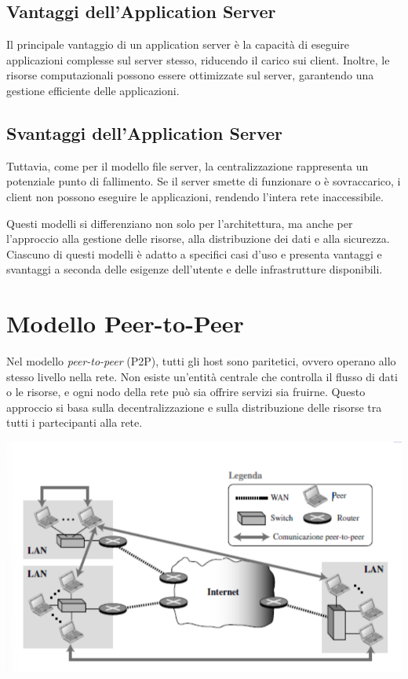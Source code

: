 \documentclass[12pt]{report}
\begin{document}
	\subsection{Vantaggi dell'Application Server}
	Il principale vantaggio di un application server è la capacità di eseguire applicazioni complesse sul server stesso, riducendo il carico sui client. Inoltre, le risorse computazionali possono essere ottimizzate sul server, garantendo una gestione efficiente delle applicazioni.

	\subsection{Svantaggi dell'Application Server}
	Tuttavia, come per il modello file server, la centralizzazione rappresenta un potenziale punto di fallimento. Se il server smette di funzionare o è sovraccarico, i client non possono eseguire le applicazioni, rendendo l'intera rete inaccessibile.

	Questi modelli si differenziano non solo per l'architettura, ma anche per l'approccio alla gestione delle risorse, alla distribuzione dei dati e alla sicurezza. Ciascuno di questi modelli è adatto a specifici casi d'uso e presenta vantaggi e svantaggi a seconda delle esigenze dell'utente e delle infrastrutture disponibili.

	\section{Modello Peer-to-Peer}
	Nel modello \textit{peer-to-peer} (P2P), tutti gli host sono paritetici, ovvero operano allo stesso livello nella rete. Non esiste un'entità centrale che controlla il flusso di dati o le risorse, e ogni nodo della rete può sia offrire servizi sia fruirne. Questo approccio si basa sulla decentralizzazione e sulla distribuzione delle risorse tra tutti i partecipanti alla rete.

	\begin{center}
		\includegraphics[scale=0.5]{assets/p2p.png}
	\end{center}
\end{document}
